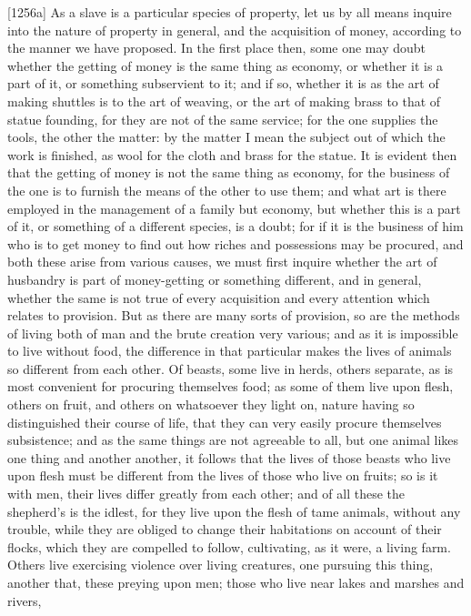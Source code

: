 [1256a] As a slave is a particular species of property, let us by all
means inquire into the nature of property in general, and the acquisition
of money, according to the manner we have proposed. In the first place
then, some one may doubt whether the getting of money is the same thing as
economy, or whether it is a part of it, or something subservient to it;
and if so, whether it is as the art of making shuttles is to the art of
weaving, or the art of making brass to that of statue founding, for they
are not of the same service; for the one supplies the tools, the other the
matter: by the matter I mean the subject out of which the work is
finished, as wool for the cloth and brass for the statue. It is evident
then that the getting of money is not the same thing as economy, for the
business of the one is to furnish the means of the other to use them; and
what art is there employed in the management of a family but economy, but
whether this is a part of it, or something of a different species, is a
doubt; for if it is the business of him who is to get money to find out
how riches and possessions may be procured, and both these arise from
various causes, we must first inquire whether the art of husbandry is part
of money-getting or something different, and in general, whether the same
is not true of every acquisition and every attention which relates to
provision. But as there are many sorts of provision, so are the methods of
living both of man and the brute creation very various; and as it is
impossible to live without food, the difference in that particular makes
the lives of animals so different from each other. Of beasts, some live in
herds, others separate, as is most convenient for procuring themselves
food; as some of them live upon flesh, others on fruit, and others on
whatsoever they light on, nature having so distinguished their course of
life, that they can very easily procure themselves subsistence; and as the
same things are not agreeable to all, but one animal likes one thing and
another another, it follows that the lives of those beasts who live upon
flesh must be different from the lives of those who live on fruits; so is
it with men, their lives differ greatly from each other; and of all these
the shepherd's is the idlest, for they live upon the flesh of tame
animals, without any trouble, while they are obliged to change their
habitations on account of their flocks, which they are compelled to
follow, cultivating, as it were, a living farm. Others live exercising
violence over living creatures, one pursuing this thing, another that,
these preying upon men; those who live near lakes and marshes and rivers,
